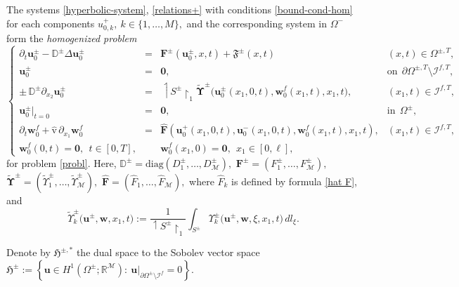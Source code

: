 \documentclass[reqno]{amsart}            %
\numberwithin{equation}{section}
\begin{document}
	The systems \eqref{hyperbolic-system}, \eqref{relations+} with conditions \eqref{bound-cond-hom} for each components $u^+_{0,k}, \ k \in \{1,\ldots,M\},$ and the corresponding system in $\Omega^-$ form
	the \textit{homogenized problem}
	\begin{equation}\label{homo-problem}
		\left\{\begin{array}{rcll}
			\partial_t \mathbf{u}^\pm_0 -   \mathbb{D}^\pm \Delta \mathbf{u}^\pm_0
			& = & \mathbf{F}^\pm(\mathbf{u}^\pm_0, x, t) + \boldsymbol{\mathfrak{F}}^\pm(x,t) & (x,t) \in \Omega^{\pm, T} ,
			\\[2mm]
			\mathbf{u}^\pm_0  & = & \mathbf{0}, & \text{on} \ \ \partial\Omega^{\pm, T}  \setminus \mathcal{I}^{f,T},
			\\[2mm]
			\pm\, \mathbb{D}^\pm \partial_{x_2} \mathbf{u}^\pm_0&=& 
			\upharpoonleft\!\! {S}^\pm\!\!\upharpoonright_1\widetilde{\boldsymbol{\Upsilon}}^\pm\big(\mathbf{u}^\pm_0(x_1,0,t), \mathbf{w}^f_0(x_1,t), x_1, t \big), & (x_1, t) \in \mathcal{I}^{f,T},
			\\[2mm]
			\mathbf{u}^\pm_0 \big|_{t=0} & = & \mathbf{0}, & \text{in} \ \ \Omega^\pm  ,
			\\[2mm]
			\partial_t \mathbf{w}^f_0  + \hat{\mathrm{v}} \, \partial_{x_1} \mathbf{w}^f_0 & =& \widehat{ \mathbf {F}}(\mathbf{u}^+_0(x_1,0,t), \mathbf{u}^-_0(x_1,0,t), \mathbf{w}^f_0(x_1,t), x_1, t), &
			(x_1,t) \in \mathcal{I}^{f, T},
			\\[3pt]
			\mathbf{w}^f_0(0,t)= \mathbf{0}, \ \ t\in [0,T], & & \mathbf{w}^f_0(x_1,0)= \mathbf{0}, \ \ x_1\in [0, \ell],
		\end{array}\right.
	\end{equation}
	for problem \eqref{probl}. Here,  $\mathbb{D}^\pm = \text{diag}(D^\pm_1,\ldots,D^\pm_\mathcal{M}),$
	$\mathbf{F}^\pm=(F^\pm_1,\ldots,F^\pm_\mathcal{M}),$ $\widetilde{\boldsymbol{\Upsilon}}^\pm=(\widetilde{\Upsilon}^\pm_1,\ldots,\widetilde{\Upsilon}^\pm_\mathcal{M}),$ $\widehat{\mathbf{F}}=(\widehat{F}_1,\ldots,\widehat{F}_\mathcal{M}),$ where $\widehat{F}_k$ is defined by  formula \eqref{hat F},  and 
	\begin{equation}\label{eq-22}
		\widetilde{\Upsilon}^\pm_k\big(\mathbf{u}^\pm, \mathbf{w}, x_1, t \big) :=  \frac{1}{\upharpoonleft\!\! {S}^\pm\!\!\upharpoonright_1}
		\int_{S^\pm}  \Upsilon^\pm_k\big(\mathbf{u}^\pm, \mathbf{w}, \xi, x_1, t \big) \, dl_\xi  .
	\end{equation}
	
	Denote by $\boldsymbol{\mathfrak{H}}^{\pm, *} $ the dual space to the Sobolev vector space 
	$\boldsymbol{\mathfrak{H}}^{\pm} := \left\{ \mathbf{u}\in H^1(\Omega^\pm; \mathbb{R}^\mathcal{M})\colon \ \mathbf{u}\big|_{\partial\Omega^\pm \setminus \mathcal{I}^f } =0 \right\}.$
	
\end{document}
